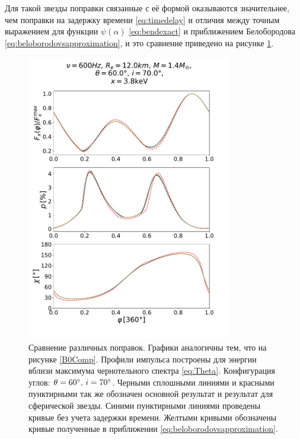 \documentclass[14pt,a4paper]{extarticle}
\begin{document}
			 
			Для такой звезды поправки связанные с её формой оказываются значительнее, чем поправки на задержку времени \eqref{eq:timedelay} и  
			отличия между точным выражением для функции $\psi(\alpha)$
			\eqref{eq:bendexact}
			и приближением Белобородова
			\eqref{eq:beloborodovsapproximation}, и это сравнение приведено на рисунке \ref{fig:allComp}.

			\begin{figure}[H]
				\centering
				\includegraphics[width=0.8\textwidth]{B10Comb0Ff110.pdf}
				\caption{\small
					Сравнение различных поправок. Графики аналогичны тем, что на рисунке \ref{B0Comp}.
					Профили импульса построены для энергии вблизи максимума чернотельного спектра \eqref{eq:Theta}.
					Конфигурация углов: $\theta = 60 \degree, \, i = 70\degree$.
					Черными сплошными линиями и красными пунктирными так же обозначен основной результат и результат для сферической звезды. 
					Синими пунктирными линиями проведены кривые без учета задержки времени. Желтыми кривыми обозначены кривые полученные в приближении \eqref{eq:beloborodovsapproximation}. 
					}\label{fig:allComp}
			\end{figure}
\end{document}
